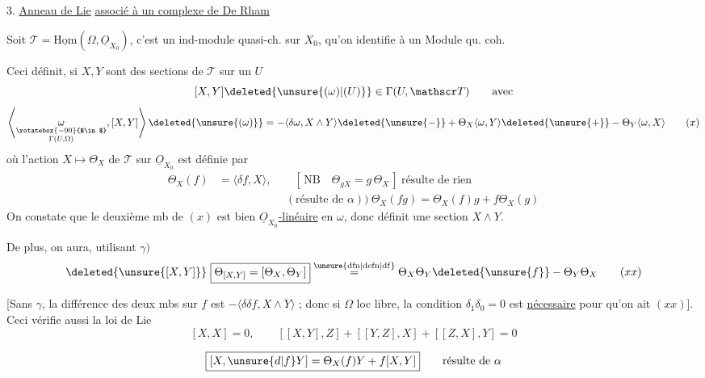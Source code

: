 
3.\quad {} \uline{Anneau de Lie} \uline{associé à un complexe de De Rham}

Soit $\mathscr T=\underline{\mathrm{Hom}}(\Omega,\underline O_{X_0})$, c'est un ind-module quasi-ch. sur $X_0$, qu'on identifie à un Module qu. coh.

Ceci définit, si $X,Y$ sont des sections de $\mathscr T$  sur un $U$
\[
[X,Y]\deleted{\unsure{(\omega)|(U)}}\in\Gamma(U,\mathscr T)\qquad\text{avec}
\]
\[
\left\langle\underset{\substack{\rotatebox{-90}{$\in$}\\\Gamma(U,\Omega)}}{\omega},[X,Y]\right\rangle\deleted{\unsure{(\omega)}}=-\langle\delta\omega,X\wedge Y\rangle\deleted{\unsure{-}}+\Theta_X\langle\omega,Y\rangle\deleted{\unsure{+}}-\Theta_Y\langle\omega,X\rangle
\tag*{$(x)$}
\]
où l'action $X\mapsto\Theta_X$ de $\mathscr T$ sur $\underline O_{X_0}$  est définie par
\[
\begin{aligned}
\Theta_X(f)&=\langle\delta f,X\rangle,\qquad [\,\text{NB}\quad\boxed{\Theta_{gX}=g\,\Theta_X}\,]\ \text{résulte de rien}\\
&\hspace{6em}(\text{résulte de }\alpha))\ \boxed{\Theta_X(fg)=\Theta_X(f)g+f\Theta_X(g)}
\end{aligned}
\]
On constate  que le deuxième mb de $(x)$ est bien \uline{$\underline O_{X_0}$-linéaire} en $\omega$, donc définit une section $X\wedge Y$.

De plus, on aura, utilisant $\gamma)$
\[
\deleted{\unsure{[X,Y]}}\ \boxed{\Theta_{[X,Y]}=[\Theta_X,\Theta_Y]}\overset{\mathrm{\unsure{dfn|defn|df}}}{=}\Theta_X\Theta_Y\deleted{\unsure{f}}-\Theta_Y\Theta_X
\tag*{$(xx)$}
\]
\deleted{[\unsure{Si on|Sinon} \unsure{veut|vient} l'autre définition}

[Sans $\gamma$, la  différence des deux mbs sur $f$ est $-\langle\delta\delta f,X\wedge Y\rangle$ ; donc si $\Omega$ loc libre, la condition $\delta_1\delta_0=0$ est \uline{nécessaire} pour qu'on ait $(xx)$]. Ceci vérifie aussi la loi de Lie
\[
\boxed{[X,X]=0},\qquad\boxed{[[X,Y],Z]+[[Y,Z],X]+[[Z,X],Y]=0}
\]


\[
\boxed{[X,\unsure{d|f}Y]=\Theta_X(f)Y+f[X,Y]}\qquad\text{résulte de }\alpha
\]

